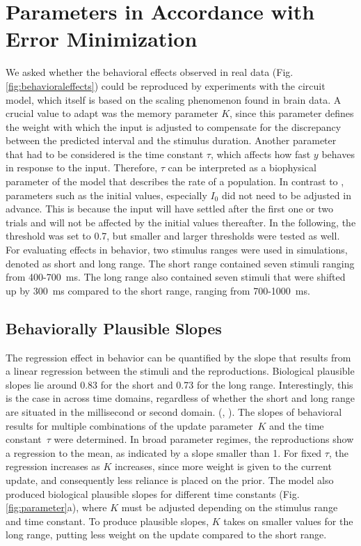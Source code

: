 \documentclass[10pt]{article}
\begin{document}
\section{Parameters in Accordance with Error Minimization}
We asked whether the behavioral effects observed in real data (Fig. \ref{fig:behavioraleffects}) could be reproduced by experiments with the circuit model, which itself is based on the scaling phenomenon found in brain data. 
A crucial value to adapt was the memory parameter $K$, since this parameter defines the weight with which the input is adjusted to compensate for the discrepancy between the predicted interval and the stimulus duration.
Another parameter that had to be considered is the time constant $\tau$, which affects how fast $y$ behaves in response to the input. Therefore, $\tau$ can be interpreted as a biophysical parameter of the model that describes the rate of a population.
In contrast to \cite{Egger2020}, parameters such as the initial values, especially $I_0$ did not need to be adjusted in advance. This is because the input will have settled after the first one or two trials and will not be affected by the initial values thereafter.
In the following, the threshold was set to 0.7, but smaller and larger thresholds were tested as well.
For evaluating effects in behavior, two stimulus ranges were used in simulations, denoted as short and long range. The short range contained seven stimuli ranging from 400-700~ms. The long range also contained seven stimuli that were shifted up by 300~ms compared to the short range, ranging from 700-1000~ms.

 
\subsection{Behaviorally Plausible Slopes}
The regression effect in behavior can be quantified by the slope that results from a linear regression between the stimuli and the reproductions.
Biological plausible slopes lie around 0.83 for the short and 0.73 for the long range.
Interestingly, this is the case in across time domains, regardless of whether the short and long range are situated in the millisecond or second domain. (\cite{Thurley2018}, \cite{Jazayeri2010}). 
The slopes of behavioral results for multiple combinations of the update parameter~$K$ and the time constant~$\tau$ were determined. 
In broad parameter regimes, the reproductions show a regression to the mean, as indicated by a slope smaller than 1. 
For fixed $\tau$, the regression increases as $K$ increases, since more weight is given to the current update, and consequently less reliance is placed on the prior. 
The model also produced biological plausible slopes for different time constants (Fig. \ref{fig:parameter}a), where $K$ must be adjusted depending on the stimulus range and time constant. 
To produce plausible slopes, $K$ takes on smaller values for the long range, putting less weight on the update compared to the short range.
\end{document}
